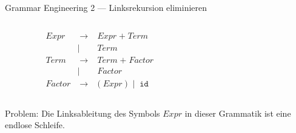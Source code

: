 \documentclass{beamer}
\begin{document}
\begin{frame}{Grammar Engineering 2 --- Linksrekursion eliminieren}
  \begin{columns}
    \begin{column}{0.5\textwidth}
      \begin{alignat*}{2}
        & Expr   & \; \to \; & Expr \; \texttt{+} \; Term \\
              && \mid \;\; & Term \\
        & Term   & \; \to \; & Term \; \texttt{+} \; Factor \\
                && \mid \;\; & Factor \\
        & Factor & \; \to \; & \texttt{(} \; Expr \; \texttt{)} \; \mid \; \texttt{id}
      \end{alignat*}

    \end{column}
    \begin{column}{0.5\textwidth}
      \begin{figure}
      \end{figure}
    \end{column}
  \end{columns}

  \vfill

  Problem: Die Linksableitung des Symbols $Expr$ in dieser Grammatik ist eine endlose Schleife.
\end{frame}
\end{document}
